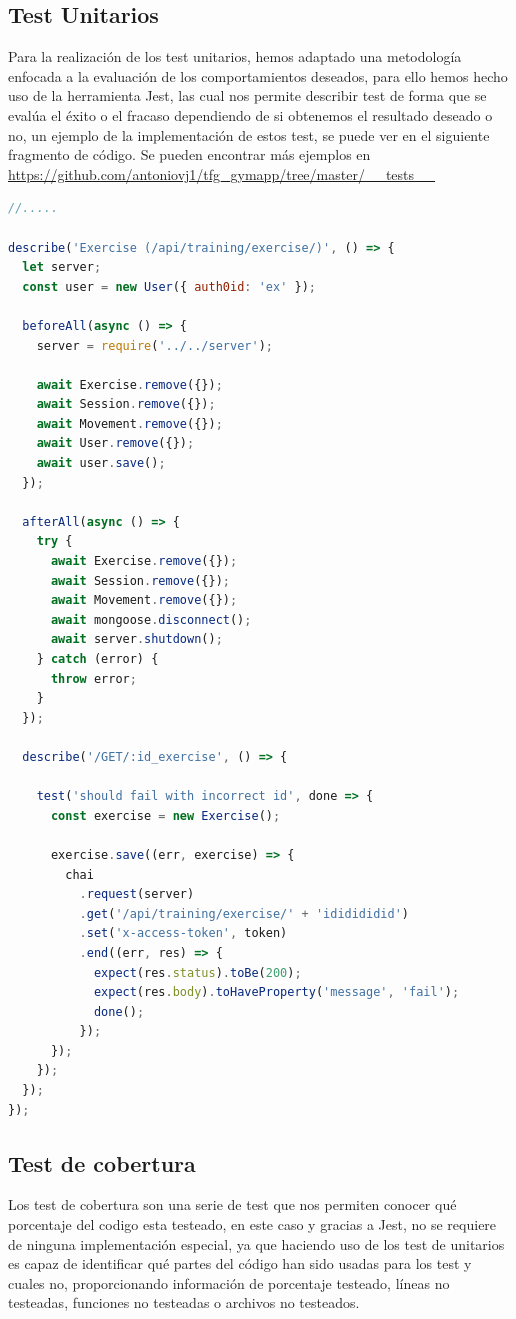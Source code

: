 \subsection {Test Unitarios}
Para la realización de los test unitarios, hemos adaptado una metodología enfocada a la evaluación de los comportamientos deseados, para ello hemos hecho uso de la herramienta Jest, las cual nos permite describir test de forma que se evalúa el éxito o el fracaso dependiendo de si obtenemos el resultado deseado o no, un ejemplo de la implementación de estos test, se puede ver en el siguiente fragmento de código. Se pueden encontrar más ejemplos en \url{https://github.com/antoniovj1/tfg_gymapp/tree/master/__tests__}
\begin{lstlisting}[language=javascript,caption={Test Unitarios},label={lst:appjs}]
//.....

describe('Exercise (/api/training/exercise/)', () => {
  let server;
  const user = new User({ auth0id: 'ex' });

  beforeAll(async () => {
    server = require('../../server');

    await Exercise.remove({});
    await Session.remove({});
    await Movement.remove({});
    await User.remove({});
    await user.save();
  });

  afterAll(async () => {
    try {
      await Exercise.remove({});
      await Session.remove({});
      await Movement.remove({});
      await mongoose.disconnect();
      await server.shutdown();
    } catch (error) {
      throw error;
    }
  });

  describe('/GET/:id_exercise', () => {

    test('should fail with incorrect id', done => {
      const exercise = new Exercise();

      exercise.save((err, exercise) => {
        chai
          .request(server)
          .get('/api/training/exercise/' + 'ididididid')
          .set('x-access-token', token)
          .end((err, res) => {
            expect(res.status).toBe(200);
            expect(res.body).toHaveProperty('message', 'fail');
            done();
          });
      });
    });
  });
});
\end{lstlisting}
\subsection { Test de cobertura }
Los test de cobertura son una serie de test que nos permiten conocer qué porcentaje del codigo esta testeado, en este caso y gracias a Jest, no se requiere de ninguna implementación especial, ya que haciendo uso de los test de unitarios es capaz de identificar qué partes del código han sido usadas para los test y cuales no, proporcionando información de porcentaje testeado, líneas no testeadas, funciones no testeadas o archivos no testeados.

